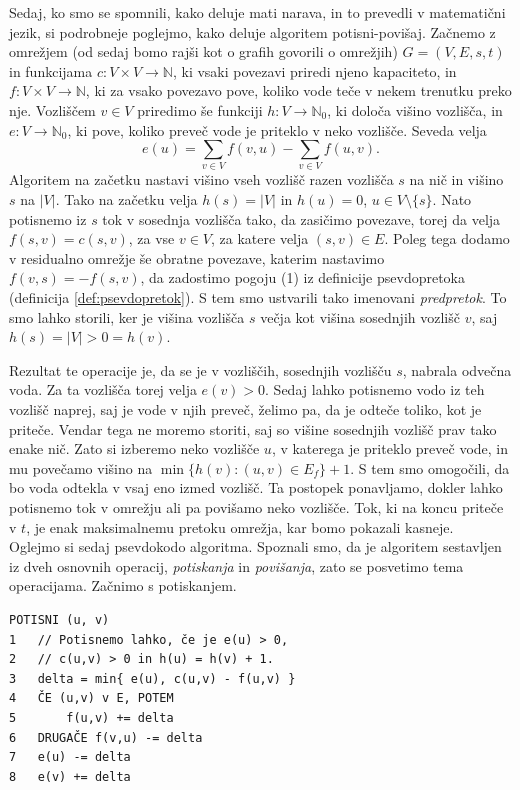\documentclass[mat1]{fmfdelo}
\newcommand{\N}{\mathbb N}
\begin{document}
Sedaj, ko smo se spomnili, kako deluje mati narava, in to prevedli v matematični jezik, si podrobneje poglejmo, kako deluje algoritem potisni-povišaj. Začnemo z omrežjem (od sedaj bomo rajši kot o grafih govorili o omrežjih) $G = (V, E, s, t)$ in funkcijama $c\colon V \times V \rightarrow \N$, ki vsaki povezavi priredi njeno kapaciteto, in $f\colon V \times V \rightarrow \N$, ki za vsako povezavo pove, koliko vode teče v nekem trenutku preko nje. Vozliščem $v \in V$ priredimo še funkciji $h\colon V \rightarrow \N_0$, ki določa višino vozlišča, in $e\colon V \rightarrow \N_0$, ki pove, koliko preveč vode je priteklo v neko vozlišče. Seveda velja \[e(u) = \sum_{v \in V} f(v,u) - \sum_{v \in V} f(u,v).\] Algoritem na začetku nastavi višino vseh vozlišč razen vozlišča $s$ na nič in višino $s$ na $|V|$. Tako na začetku velja $h(s) = |V|$ in $h(u) = 0$, $u \in V \setminus \{s\}$. Nato potisnemo iz $s$ tok v sosednja vozlišča tako, da zasičimo povezave, torej da velja $f(s, v) = c(s, v)$, za vse $v \in V$, za katere velja $(s, v) \in E$. Poleg tega dodamo v residualno omrežje še obratne povezave, katerim nastavimo $f(v,s) = -f(s,v)$, da zadostimo pogoju (1) iz definicije psevdopretoka (definicija \ref{def:psevdopretok}). S tem smo ustvarili tako imenovani \textit{predpretok}. To smo lahko storili, ker je višina vozlišča $s$ večja kot višina sosednjih vozlišč $v$, saj $h(s) = |V| > 0 = h(v)$.

Rezultat te operacije je, da se je v vozliščih, sosednjih vozlišču $s$, nabrala odvečna voda. Za ta vozlišča torej velja $e(v) > 0$. Sedaj lahko potisnemo vodo iz teh vozlišč naprej, saj je vode v njih preveč, želimo pa, da je odteče toliko, kot je priteče. Vendar tega ne moremo storiti, saj so višine sosednjih vozlišč prav tako enake nič. Zato si izberemo neko vozlišče $u$, v katerega je priteklo preveč vode, in mu povečamo višino na $\min\{h(v) : (u,v) \in E_f\} + 1$. S tem smo omogočili, da bo voda odtekla v vsaj eno izmed vozlišč. Ta postopek ponavljamo, dokler lahko potisnemo tok v omrežju ali pa povišamo neko vozlišče. Tok, ki na koncu priteče v $t$, je enak maksimalnemu pretoku omrežja, kar bomo pokazali kasneje.\\

Oglejmo si sedaj psevdokodo algoritma. Spoznali smo, da je algoritem sestavljen iz dveh osnovnih operacij, \textit{potiskanja} in \textit{povišanja}, zato se posvetimo tema operacijama. Začnimo s potiskanjem.\\

\begin{verbatim}
POTISNI (u, v)
1   // Potisnemo lahko, če je e(u) > 0,
2   // c(u,v) > 0 in h(u) = h(v) + 1.
3   delta = min{ e(u), c(u,v) - f(u,v) }
4   ČE (u,v) v E, POTEM
5       f(u,v) += delta
6   DRUGAČE f(v,u) -= delta
7   e(u) -= delta
8   e(v) += delta
\end{verbatim}~
\end{document}
